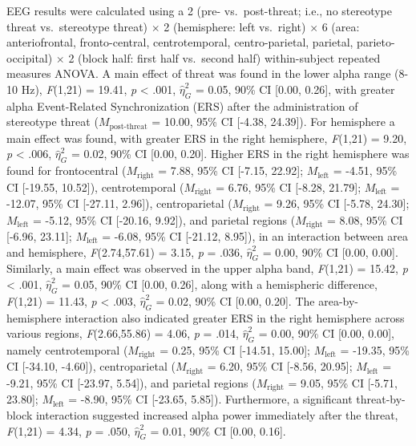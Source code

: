 \documentclass[
  stu,floatsintext]{apa7}
\begin{document}
EEG results were calculated using a 2 (pre- vs.~post-threat; i.e., no stereotype threat vs.~stereotype threat) \(\times\) 2 (hemisphere: left vs.~right) \(\times\) 6 (area: anteriofrontal, fronto-central, centrotemporal, centro-parietal, parietal, parieto-occipital) \(\times\) 2 (block half: first half vs.~second half) within-subject repeated measures ANOVA.
A main effect of threat was found in the lower alpha range (8-10 Hz), \emph{F}(1,21) = 19.41, \emph{p} \textless{} .001, \(\hat{\eta}^{2}_{G}\) = 0.05, 90\% CI {[}0.00, 0.26{]}, with greater alpha Event-Related Synchronization (ERS) after the administration of stereotype threat (\(M_{\text{post-threat}}\) = 10.00, 95\% CI {[}-4.38, 24.39{]}).
For hemisphere a main effect was found, with greater ERS in the right hemisphere, \emph{F}(1,21) = 9.20, \emph{p} \textless{} .006, \(\hat{\eta}^{2}_{G}\) = 0.02, 90\% CI {[}0.00, 0.20{]}.
Higher ERS in the right hemisphere was found for frontocentral (\(M_{\text{right}}\) = 7.88, 95\% CI {[}-7.15, 22.92{]}; \(M_{\text{left}}\) = -4.51, 95\% CI {[}-19.55, 10.52{]}), centrotemporal (\(M_{\text{right}}\) = 6.76, 95\% CI {[}-8.28, 21.79{]}; \(M_{\text{left}}\) = -12.07, 95\% CI {[}-27.11, 2.96{]}), centroparietal (\(M_{\text{right}}\) = 9.26, 95\% CI {[}-5.78, 24.30{]}; \(M_{\text{left}}\) = -5.12, 95\% CI {[}-20.16, 9.92{]}), and parietal regions (\(M_{\text{right}}\) = 8.08, 95\% CI {[}-6.96, 23.11{]}; \(M_{\text{left}}\) = -6.08, 95\% CI {[}-21.12, 8.95{]}), in an interaction between area and hemisphere, \emph{F}(2.74,57.61) = 3.15, \emph{p} = .036, \(\hat{\eta}^{2}_{G}\) = 0.00, 90\% CI {[}0.00, 0.00{]}.
Similarly, a main effect was observed in the upper alpha band, \emph{F}(1,21) = 15.42, \emph{p} \textless{} .001, \(\hat{\eta}^{2}_{G}\) = 0.05, 90\% CI {[}0.00, 0.26{]}, along with a hemispheric difference, \emph{F}(1,21) = 11.43, \emph{p} \textless{} .003, \(\hat{\eta}^{2}_{G}\) = 0.02, 90\% CI {[}0.00, 0.20{]}.
The area-by-hemisphere interaction also indicated greater ERS in the right hemisphere across various regions, \emph{F}(2.66,55.86) = 4.06, \emph{p} = .014, \(\hat{\eta}^{2}_{G}\) = 0.00, 90\% CI {[}0.00, 0.00{]}, namely centrotemporal (\(M_{\text{right}}\) = 0.25, 95\% CI {[}-14.51, 15.00{]}; \(M_{\text{left}}\) = -19.35, 95\% CI {[}-34.10, -4.60{]}), centroparietal (\(M_{\text{right}}\) = 6.20, 95\% CI {[}-8.56, 20.95{]}; \(M_{\text{left}}\) = -9.21, 95\% CI {[}-23.97, 5.54{]}), and parietal regions (\(M_{\text{right}}\) = 9.05, 95\% CI {[}-5.71, 23.80{]}; \(M_{\text{left}}\) = -8.90, 95\% CI {[}-23.65, 5.85{]}).
Furthermore, a significant threat-by-block interaction suggested increased alpha power immediately after the threat, \emph{F}(1,21) = 4.34, \emph{p} = .050, \(\hat{\eta}^{2}_{G}\) = 0.01, 90\% CI {[}0.00, 0.16{]}.
\end{document}
